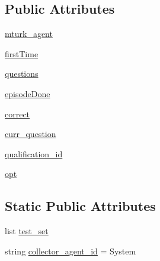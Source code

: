 \subsection*{Public Attributes}
\begin{DoxyCompactItemize}
\item 
\hyperlink{classparlai_1_1mturk_1_1tasks_1_1qualification__flow__example_1_1worlds_1_1QualificationFlowSoloWorld_a3adec199df30efa7c83a6d92de25b1c1}{mturk\+\_\+agent}
\item 
\hyperlink{classparlai_1_1mturk_1_1tasks_1_1qualification__flow__example_1_1worlds_1_1QualificationFlowSoloWorld_a8078da8a5070aeb6a71f5fb04ce8a48e}{first\+Time}
\item 
\hyperlink{classparlai_1_1mturk_1_1tasks_1_1qualification__flow__example_1_1worlds_1_1QualificationFlowSoloWorld_a0b1d8548a0a7927253169f2ca0603526}{questions}
\item 
\hyperlink{classparlai_1_1mturk_1_1tasks_1_1qualification__flow__example_1_1worlds_1_1QualificationFlowSoloWorld_a1264fae93c78bc48bdba79d0fee88e2b}{episode\+Done}
\item 
\hyperlink{classparlai_1_1mturk_1_1tasks_1_1qualification__flow__example_1_1worlds_1_1QualificationFlowSoloWorld_a2c6f4ecd7fd17c4d16d7074816562656}{correct}
\item 
\hyperlink{classparlai_1_1mturk_1_1tasks_1_1qualification__flow__example_1_1worlds_1_1QualificationFlowSoloWorld_ae93e005831e10fa1bb215a8565a2d7d7}{curr\+\_\+question}
\item 
\hyperlink{classparlai_1_1mturk_1_1tasks_1_1qualification__flow__example_1_1worlds_1_1QualificationFlowSoloWorld_a201c886bc3659ba6f4a59c6ea568b6f6}{qualification\+\_\+id}
\item 
\hyperlink{classparlai_1_1mturk_1_1tasks_1_1qualification__flow__example_1_1worlds_1_1QualificationFlowSoloWorld_aca37e756d5c9ef6ae9031b42ccc1ab75}{opt}
\end{DoxyCompactItemize}
\subsection*{Static Public Attributes}
\begin{DoxyCompactItemize}
\item 
list \hyperlink{classparlai_1_1mturk_1_1tasks_1_1qualification__flow__example_1_1worlds_1_1QualificationFlowSoloWorld_ae37fba2e716a74c306a5b0804f7d048a}{test\+\_\+set}
\item 
string \hyperlink{classparlai_1_1mturk_1_1tasks_1_1qualification__flow__example_1_1worlds_1_1QualificationFlowSoloWorld_a39c1a522254addc7cec501130a05923c}{collector\+\_\+agent\+\_\+id} = \textquotesingle{}System\textquotesingle{}
\end{DoxyCompactItemize}


